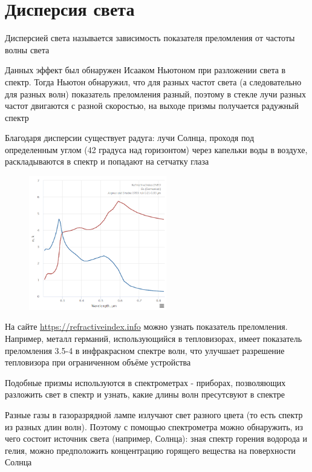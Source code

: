 \section{Дисперсия света}

Дисперсией света называется зависимость показателя преломления от частоты волны света

Данных эффект был обнаружен Исааком Ньютоном при разложении света в спектр. Тогда Ньютон обнаружил, что для разных частот света (а следовательно для разных волн) показатель преломления разный, поэтому в стекле лучи разных частот двигаются с разной скоростью, на выходе призмы получается радужный спектр 

Благодаря дисперсии существует радуга: лучи Солнца, проходя под определенным углом (42 градуса над горизонтом) через капельки воды в воздухе, раскладываются в спектр и попадают на сетчатку глаза

\begin{figure}
    \includegraphics[width=6cm]{physics3/images/physics3_germanium_refractive_index}
\end{figure}

На сайте \url{https://refractiveindex.info} можно узнать показатель преломления. Например, металл германий, использующийся в тепловизорах, имеет показатель преломления 3.5-4 в инфракрасном спектре волн, что улучшает разрешение тепловизора при ограниченном объёме устройства

Подобные призмы используются в спектрометрах - приборах, позволяющих разложить свет в спектр и узнать, какие длины волн пресутсвуют в спектре

Разные газы в газоразрядной лампе излучают свет разного цвета (то есть спектр из разных длин волн). Поэтому с помощью спектрометра можно обнаружить, из чего состоит источник света (например, Солнца): зная спектр горения водорода и гелия, можно предположить концентрацию горящего вещества на поверхности Солнца

